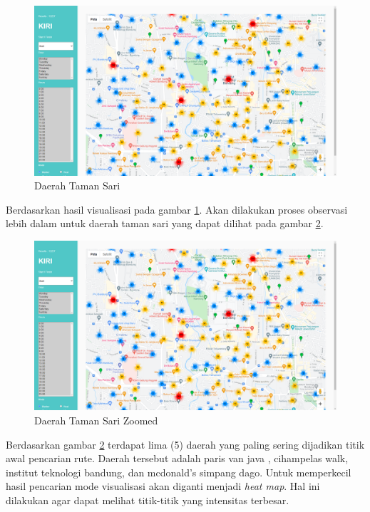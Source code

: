 \begin{figure}[H]
	\centering  
	\includegraphics[scale=0.3]{Gambar/pengujian/taman-sari.png}  
	\caption[Daerah Taman Sari]{Daerah Taman Sari} 
	\label{fig:tamanSari}
\end{figure}

Berdasarkan hasil visualisasi pada gambar \ref{fig:tamanSari}. Akan dilakukan proses observasi lebih dalam untuk daerah taman sari yang dapat dilihat pada gambar \ref{fig:tamanSariZoom}.
\begin{figure}[H]
	\centering  
	\includegraphics[scale=0.3]{Gambar/pengujian/taman-sari.png}  
	\caption[Daerah Taman Sari Zoomed]{Daerah Taman Sari Zoomed} 
	\label{fig:tamanSariZoom}
\end{figure}

Berdasarkan gambar \ref{fig:tamanSariZoom} terdapat lima (5) daerah yang paling sering dijadikan titik awal pencarian rute. Daerah tersebut adalah   paris van java , cihampelas walk, institut teknologi bandung, dan mcdonald's simpang dago. Untuk memperkecil hasil pencarian mode visualisasi akan diganti menjadi \textit{heat map}. Hal ini dilakukan agar dapat melihat titik-titik yang intensitas terbesar. 


